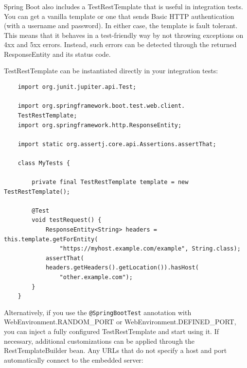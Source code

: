 \documentclass{scrartcl}
\begin{document}
Spring Boot also includes a TestRestTemplate that is useful in integration tests. You can get a vanilla template or one that sends Basic HTTP authentication (with a username and password). In either case, the template is fault tolerant. This means that it behaves in a test-friendly way by not throwing exceptions on 4xx and 5xx errors. Instead, such errors can be detected through the returned ResponseEntity and its status code.

TestRestTemplate can be instantiated directly in your integration tests:

\begin{lstlisting}
    import org.junit.jupiter.api.Test;

    import org.springframework.boot.test.web.client.
    TestRestTemplate;
    import org.springframework.http.ResponseEntity;

    import static org.assertj.core.api.Assertions.assertThat;

    class MyTests {

        private final TestRestTemplate template = new TestRestTemplate();

        @Test
        void testRequest() {
            ResponseEntity<String> headers = this.template.getForEntity(
                "https://myhost.example.com/example", String.class);
            assertThat(
            headers.getHeaders().getLocation()).hasHost(
                "other.example.com");
        }
    }
\end{lstlisting}

Alternatively, if you use the \lstinline|@SpringBootTest| annotation with WebEnvironment.RANDOM\_PORT or WebEnvironment.DEFINED\_PORT, you can inject a fully configured TestRestTemplate and start using it. If necessary, additional customizations can be applied through the RestTemplateBuilder bean. Any URLs that do not specify a host and port automatically connect to the embedded server:
\end{document}
